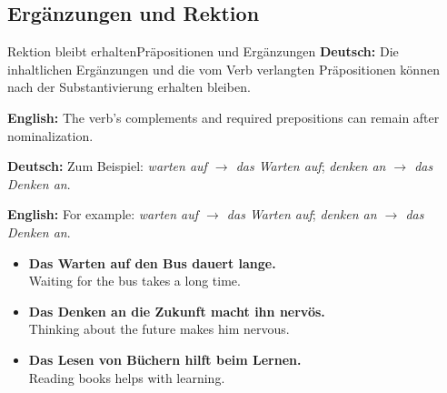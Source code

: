 \documentclass[a4paper,11pt]{article}
\newcommand{\GermanText}[1]{\textbf{Deutsch: }#1\par}
\newcommand{\EnglishText}[1]{{\small\color{SoftGray}\textbf{English: }#1\par}}
\newcommand{\ExampleItem}[2]{\item \textbf{#1}\\{\small\color{SoftGray}#2}}
\begin{document}
\begin{preview}
\section{Ergänzungen und Rektion}
\begin{grammarentry}{Rektion bleibt erhalten}{Präpositionen und Ergänzungen}
\GermanText{Die inhaltlichen Ergänzungen und die vom Verb verlangten Präpositionen können nach der Substantivierung erhalten bleiben.}
\EnglishText{The verb's complements and required prepositions can remain after nominalization.}
\GermanText{Zum Beispiel: \textit{warten auf $\rightarrow$ das Warten auf}; \textit{denken an $\rightarrow$ das Denken an}.}
\EnglishText{For example: \textit{warten auf $\rightarrow$ das Warten auf}; \textit{denken an $\rightarrow$ das Denken an}.}
\end{grammarentry}
\begin{exbox}\begin{itemize}
\ExampleItem{Das Warten auf den Bus dauert lange.}{Waiting for the bus takes a long time.}
\ExampleItem{Das Denken an die Zukunft macht ihn nervös.}{Thinking about the future makes him nervous.}
\ExampleItem{Das Lesen von Büchern hilft beim Lernen.}{Reading books helps with learning.}
\end{itemize}\end{exbox}


\end{preview}
\end{document}
